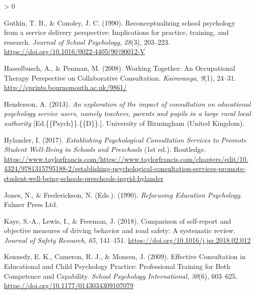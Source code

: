 \documentclass[
  english,
  man,floatsintext]{apa6}
\newlength{\cslhangindent}
\newenvironment{CSLReferences}[2] %
 {%
  \setlength{\parindent}{0pt}
  \ifodd #1 \everypar{\setlength{\hangindent}{\cslhangindent}}\ignorespaces\fi
  \ifnum #2 > 0
  \setlength{\parskip}{#2\baselineskip}
  \fi
 }%
 {}
\begin{document}
\begin{CSLReferences}{1}{0}
\leavevmode\hypertarget{ref-gutkinReconceptualizingSchoolPsychology1990}{}%
Gutkin, T. B., \& Conoley, J. C. (1990). Reconceptualizing school psychology from a service delivery perspective: {Implications} for practice, training, and research. \emph{Journal of School Psychology}, \emph{28}(3), 203--223. \url{https://doi.org/10.1016/0022-4405(90)90012-V}

\leavevmode\hypertarget{ref-hasselbuschWorkingTogetherOccupational2008}{}%
Hasselbusch, A., \& Penman, M. (2008). Working Together: An Occupational Therapy Perspective on Collaborative Consultation. \emph{Kairaranga}, \emph{9}(1), 24--31. \url{http://eprints.bournemouth.ac.uk/9861/}

\leavevmode\hypertarget{ref-hendersonExplorationImpactConsultation2013}{}%
Henderson, A. (2013). \emph{An exploration of the impact of consultation on educational psychology service users, namely teachers, parents and pupils in a large rural local authority} {[}Ed.\{\{Psych\}\}.\{\{D\}\}.{]}. University of Birmingham (United Kingdom).

\leavevmode\hypertarget{ref-hylanderEstablishingPsychologicalConsultation2017}{}%
Hylander, I. (2017). \emph{Establishing Psychological Consultation Services to Promote Student Well-Being in Schools and Preschools} (1st ed.). Routledge. \url{https://www.taylorfrancis.com/https://www.taylorfrancis.com/chapters/edit/10.4324/9781315795188-2/establishing-psychological-consultation-services-promote-student-well-being-schools-preschools-ingrid-hylander}

\leavevmode\hypertarget{ref-jonesRefocusingEducationPsychology1990}{}%
Jones, N., \& Frederickson, N. (Eds.). (1990). \emph{Refocusing {Education Psychology}}. {Falmer Press Ltd}.

\leavevmode\hypertarget{ref-kayeComparisonSelfreportObjective2018}{}%
Kaye, S.-A., Lewis, I., \& Freeman, J. (2018). Comparison of self-report and objective measures of driving behavior and road safety: {A} systematic review. \emph{Journal of Safety Research}, \emph{65}, 141--151. \url{https://doi.org/10.1016/j.jsr.2018.02.012}

\leavevmode\hypertarget{ref-kennedyEffectiveConsultationEducational2009a}{}%
Kennedy, E. K., Cameron, R. J., \& Monsen, J. (2009). Effective {Consultation} in {Educational} and {Child Psychology Practice}: {Professional Training} for {Both Competence} and {Capability}. \emph{School Psychology International}, \emph{30}(6), 603--625. \url{https://doi.org/10.1177/0143034309107079}


\end{CSLReferences}
\end{document}
